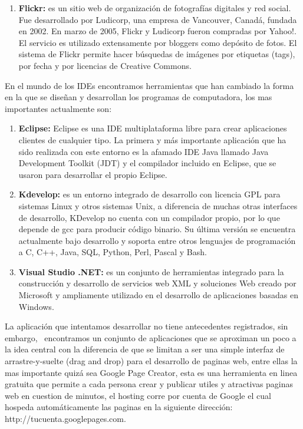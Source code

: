 \documentclass[12pt,letterpaper,oneside]{article}
\begin{document}
\begin{enumerate}
\item \textbf{Flickr:} es un sitio web de organización de
fotografías digitales y red social. Fue desarrollado por Ludicorp,
una empresa de Vancouver, Canadá, fundada en 2002. En marzo de 2005,
Flickr y Ludicorp fueron compradas por Yahoo!. El servicio es utilizado
extensamente por bloggers como depósito de fotos. El sistema de
Flickr permite hacer búsquedas de imágenes por etiquetas (tags),
por fecha y por licencias de Creative Commons.
\end{enumerate}

\bigskip

En el mundo de los IDEs encontramos herramientas que han cambiado la
forma en la que se diseñan y desarrollan los programas de
computadora, los mas importantes actualmente son:


\bigskip


\begin{enumerate}
\item \textbf{Eclipse:} Eclipse es una IDE multiplataforma libre para
crear aplicaciones clientes de cualquier tipo. La primera y más
importante aplicación que ha sido realizada con este entorno es la
afamado IDE Java llamado Java Development Toolkit (JDT) y el compilador
incluido en Eclipse, que se usaron para desarrollar el propio Eclipse.


\bigskip
\item \textbf{Kdevelop:} es un entorno integrado de desarrollo con
licencia GPL para sistemas Linux y otros sistemas Unix, a diferencia de
muchas otras interfaces de desarrollo, KDevelop no cuenta con un
compilador propio, por lo que depende de gcc para producir código
binario. Su última versión se encuentra actualmente bajo desarrollo
y soporta entre otros lenguajes de programación a C, C++, Java, SQL,
Python, Perl, Pascal y Bash.


\bigskip
\item \textbf{Visual Studio .NET:} es un conjunto de herramientas
integrado para la construcción y desarrollo de servicios web XML y
soluciones Web creado por Microsoft y ampliamente utilizado en el
desarrollo de aplicaciones basadas en Windows.
\end{enumerate}

\bigskip

La aplicación que intentamos desarrollar no tiene antecedentes
registrados, sin embargo, \ encontramos un conjunto de aplicaciones que
se aproximan un poco a la idea central con la diferencia de que se
limitan a ser una simple interfaz de arrastre{}-y{}-suelte (drag and
drop) para el desarrollo de paginas web, entre ellas la mas importante
quizá sea Google Page Creator, esta es una
herramienta en linea gratuita que permite a cada persona crear y
publicar utiles y atractivas paginas web en cuestion de minutos, el
hosting corre por cuenta de Google el cual hospeda automáticamente
las paginas en la siguiente dirección:
http://tucuenta.googlepages.com.
\end{document}
